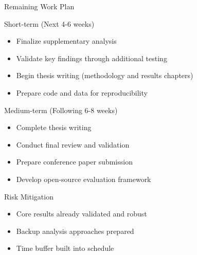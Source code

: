 \documentclass[aspectratio=169]{beamer}
\begin{document}
\begin{frame}{Remaining Work Plan}
\begin{block}{Short-term (Next 4-6 weeks)}
\begin{itemize}
    \item Finalize supplementary analysis
    \item Validate key findings through additional testing
    \item Begin thesis writing (methodology and results chapters)
    \item Prepare code and data for reproducibility
\end{itemize}
\end{block}

\begin{block}{Medium-term (Following 6-8 weeks)}
\begin{itemize}
    \item Complete thesis writing
    \item Conduct final review and validation
    \item Prepare conference paper submission
    \item Develop open-source evaluation framework
\end{itemize}
\end{block}

\begin{block}{Risk Mitigation}
\small
\begin{itemize}
    \item Core results already validated and robust
    \item Backup analysis approaches prepared
    \item Time buffer built into schedule
\end{itemize}
\end{block}
\end{frame}
\end{document}
